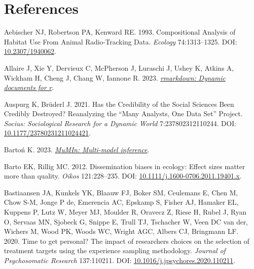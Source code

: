 \documentclass[10pt,a4paper]{article}
\newlength{\cslhangindent}
\newenvironment{CSLReferences}[2] %
 {\begin{list}{}{%
  \setlength{\itemindent}{0pt}
  \setlength{\leftmargin}{0pt}
  \setlength{\parsep}{0pt}
  \ifodd #1
   \setlength{\leftmargin}{\cslhangindent}
   \setlength{\itemindent}{-1\cslhangindent}
  \fi
  \setlength{\itemsep}{#2\baselineskip}}}
 {\end{list}}
\begin{document}
\begin{table}
{\begin{tabular}[t]{lcclcclcc}
\end{tabular}}
\end{table}

\clearpage

\section*{References}\label{references}

\label{refs}
\begin{CSLReferences}{1}{0}
Aebischer NJ, Robertson PA, Kenward RE. 1993. Compositional {Analysis} of {Habitat} {Use} {From} {Animal} {Radio}‐{Tracking} {Data}. \emph{Ecology} 74:1313--1325. DOI: \href{https://doi.org/10.2307/1940062}{10.2307/1940062}.

Allaire J, Xie Y, Dervieux C, McPherson J, Luraschi J, Ushey K, Atkins A, Wickham H, Cheng J, Chang W, Iannone R. 2023. \emph{\href{https://github.com/rstudio/rmarkdown}{{rmarkdown}: Dynamic documents for r}}.

Auspurg K, Brüderl J. 2021. Has the {Credibility} of the {Social} {Sciences} {Been} {Credibly} {Destroyed}? {Reanalyzing} the {``{Many} {Analysts}, {One} {Data} {Set}''} {Project}. \emph{Socius: Sociological Research for a Dynamic World} 7:237802312110244. DOI: \href{https://doi.org/10.1177/23780231211024421}{10.1177/23780231211024421}.

Bartoń K. 2023. \emph{\href{https://CRAN.R-project.org/package=MuMIn}{MuMIn: Multi-model inference}}.

Barto EK, Rillig MC. 2012. Dissemination biases in ecology: Effect sizes matter more than quality. \emph{Oikos} 121:228--235. DOI: \href{https://doi.org/10.1111/j.1600-0706.2011.19401.x}{10.1111/j.1600-0706.2011.19401.x}.

Bastiaansen JA, Kunkels YK, Blaauw FJ, Boker SM, Ceulemans E, Chen M, Chow S-M, Jonge P de, Emerencia AC, Epskamp S, Fisher AJ, Hamaker EL, Kuppens P, Lutz W, Meyer MJ, Moulder R, Oravecz Z, Riese H, Rubel J, Ryan O, Servaas MN, Sjobeck G, Snippe E, Trull TJ, Tschacher W, Veen DC van der, Wichers M, Wood PK, Woods WC, Wright AGC, Albers CJ, Bringmann LF. 2020. Time to get personal? {The} impact of researchers choices on the selection of treatment targets using the experience sampling methodology. \emph{Journal of Psychosomatic Research} 137:110211. DOI: \href{https://doi.org/10.1016/j.jpsychores.2020.110211}{10.1016/j.jpsychores.2020.110211}.


\end{CSLReferences}
\end{document}

